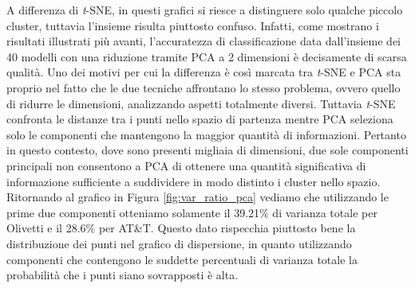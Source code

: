 \documentclass[12pt,italian]{report}
\begin{document}
A differenza di \emph{t}-SNE, in questi grafici si riesce a distinguere solo qualche piccolo cluster, tuttavia l'insieme risulta piuttosto confuso. Infatti, come mostrano i risultati illustrati più avanti, l'accuratezza di classificazione data dall'insieme dei 40 modelli con una riduzione tramite PCA a 2 dimensioni è decisamente di scarsa qualità. Uno dei motivi per cui la differenza è così marcata tra \emph{t}-SNE e PCA sta proprio nel fatto che le due tecniche affrontano lo stesso problema, ovvero quello di ridurre le dimensioni, analizzando aspetti totalmente diversi. 
Tuttavia \emph{t}-SNE confronta le distanze tra i punti nello spazio di partenza mentre PCA seleziona solo le componenti che mantengono la maggior quantità di informazioni. Pertanto in questo contesto, dove sono presenti migliaia di dimensioni, due sole componenti principali non consentono a PCA di ottenere una quantità significativa di informazione sufficiente a suddividere in modo distinto i cluster nello spazio. Ritornando al grafico in Figura \ref{fig:var_ratio_pca} vediamo che utilizzando le prime due componenti otteniamo solamente il 39.21\% di varianza totale per Olivetti e il 28.6\% per AT\&T. Questo dato rispecchia piuttosto bene la distribuzione dei punti nel grafico di dispersione, in quanto utilizzando componenti che contengono le suddette percentuali di varianza totale la probabilità che i punti siano sovrapposti è alta. 
\end{document}
